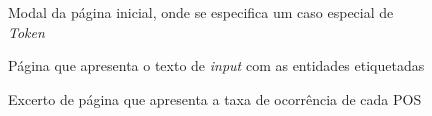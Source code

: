 \documentclass[12pt]{article}
\begin{document}
\begin{figure}[!ht]
	\centering
	\setlength{\abovecaptionskip}{-.4cm}
	\caption{Modal da página inicial, onde se especifica um caso especial de \textit{Token}}
\end{figure}

\begin{figure}[!ht]
	\centering
	\setlength{\abovecaptionskip}{-.4cm}
	\caption{Página que apresenta o texto de \textit{input} com as entidades etiquetadas}
\end{figure}

\begin{figure}[!ht]
	\centering
	\setlength{\abovecaptionskip}{-.4cm}
	\caption{Excerto de página que apresenta a taxa de ocorrência de cada POS}
\end{figure}
\end{document}
